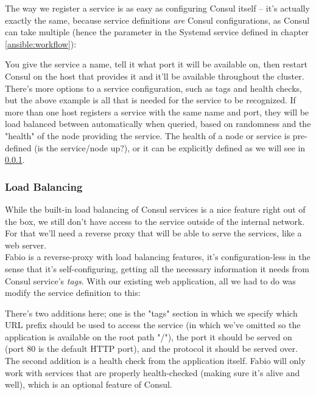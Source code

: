                 The way we register a service is as easy as configuring Consul itself -- it's actually exactly the same, because service definitions \textit{are} Consul configurations, as Consul can take multiple (hence the  parameter in the Systemd service defined in chapter \ref{ansible:workflow}):
                
                You give the service a name, tell it what port it will be available on, then restart Consul on the host that provides it and it'll be available throughout the cluster. There's more options to a service configuration, such as tags and health checks, but the above example is all that is needed for the service to be recognized. If more than one host registers a service with the same name and port, they will be load balanced between automatically when queried, based on randomness and the "health" of the node providing the service. The health of a node or service is pre-defined (is the service/node up?), or it can be explicitly defined as we will see in \ref{fabio}.
            
            \subsubsection{Load Balancing} \label{fabio}
                While the built-in load balancing of Consul services is a nice feature right out of the box, we still don't have access to the service outside of the internal network. For that we'll need a reverse proxy that will be able to serve the services, like a web server.\\
                
                Fabio is a reverse-proxy with load balancing features, it's configuration-less in the sense that it's self-configuring, getting all the necessary information it needs from Consul service's \textit{tags}. With our existing web application, all we had to do was modify the service definition to this:
                
                
                There's two additions here; one is the "tags" section in which we specify which URL prefix should be used to access the service (in which we've omitted so the application is available on the root path "/"), the port it should be served on (port 80 is the default HTTP port), and the protocol it should be served over. The second addition is a health check from the application itself. Fabio will only work with services that are properly health-checked (making sure it's alive and well), which is an optional feature of Consul.\\
                
